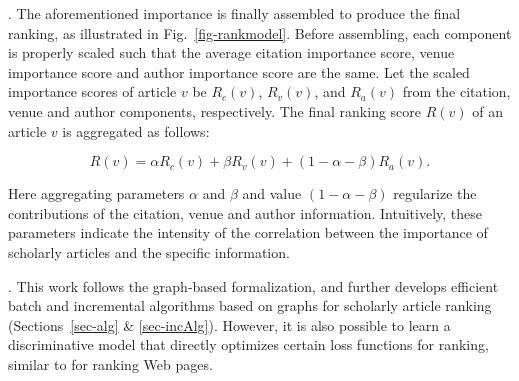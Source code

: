 




. The aforementioned importance is finally assembled to produce the final ranking, as illustrated in Fig.~\ref{fig-rankmodel}. Before assembling, each component is properly scaled such that the average citation importance score, venue importance score and author importance score
are the same.  Let the scaled importance scores of article $v$ be $R_c(v)$, $R_v(v)$, and $R_a(v)$ from the citation, venue and author components, respectively. The final ranking score $R(v)$ of an article $v$ is aggregated as follows:

\vspace{-1ex}
\begin{small}
\begin{equation} \label{eq-ensemble}
R(v) =  \alpha R_c(v) + \beta R_v(v) + (1 - \alpha - \beta) R_a(v).
\end{equation}
\end{small}
\noindent Here aggregating parameters $\alpha$ and $\beta$ and value $(1 - \alpha - \beta)$ regularize the contributions of the citation, venue and author information. Intuitively, these parameters indicate the intensity of the correlation between the importance of scholarly articles and the specific information.


. This work follows the graph-based formalization, and further develops efficient batch and incremental algorithms based on graphs for scholarly article ranking (Sections~\ref{sec-alg} \& \ref{sec-incAlg}). However, it is also possible to learn a discriminative model that directly optimizes certain loss functions for ranking, similar to \cite{Richardson06:BPR} for ranking Web pages.


